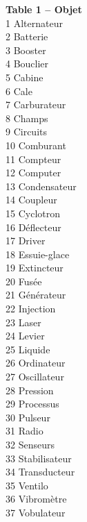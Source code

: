 \documentclass[11pt,twoside,a4paper]{article}
\begin{document}
\begin{table}[ht]
	\begin{multicols}{5}
	\small{
	
\textbf{Table 1 -- Objet}~\\
1	Alternateur~\\
2	Batterie~\\
3	Booster~\\
4	Bouclier~\\
5	Cabine~\\
6	Cale~\\
7	Carburateur~\\
8	Champs~\\
9	Circuits~\\
10	Comburant~\\
11	Compteur~\\
12	Computer~\\
13	Condensateur~\\
14	Coupleur~\\
15	Cyclotron~\\
16	D{\'e}flecteur~\\
17	Driver~\\
18	Essuie-glace~\\
19	Extincteur~\\
20	Fus{\'e}e~\\
21	G{\'e}n{\'e}rateur~\\
22	Injection~\\
23	Laser~\\
24	Levier~\\
25	Liquide~\\
26	Ordinateur~\\
27	Oscillateur~\\
28	Pression~\\
29	Processus~\\
30	Pulseur~\\
31	Radio~\\
32	Senseurs~\\
33	Stabilisateur~\\
34	Transducteur~\\
35	Ventilo~\\
36	Vibrom{\`e}tre~\\
37	Vobulateur~\\

\columnbreak

}
\end{multicols}
\end{table}
\end{document}
